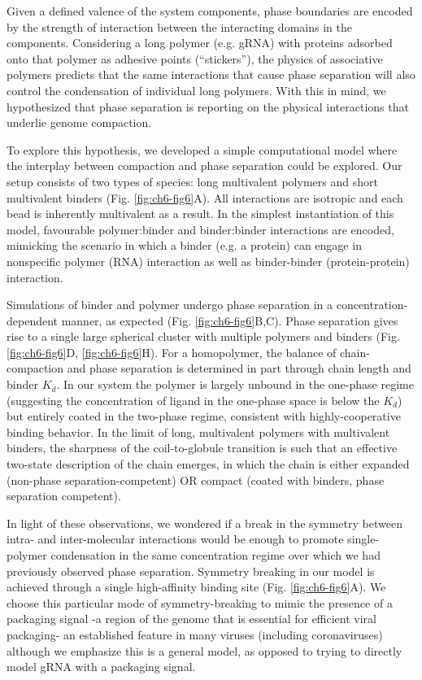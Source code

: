 \documentclass[../main.tex]{subfiles}
\begin{document}
        Given a defined valence of the system components, phase boundaries are encoded by the strength of interaction between the interacting domains in the components. Considering a long polymer (e.g. gRNA) with proteins adsorbed onto that polymer as adhesive points (“stickers”), the physics of associative polymers predicts that the same interactions that cause phase separation will also control the condensation of individual long polymers\cite{Martin2020-yc,Semenov1998-rp,Rubinstein2003-fa,Choi2020-nv,Choi2019-wg,Post1979-lv}. With this in mind, we hypothesized that phase separation is reporting on the physical interactions that underlie genome compaction.

        To explore this hypothesis, we developed a simple computational model where the interplay between compaction and phase separation could be explored. Our setup consists of two types of species: long multivalent polymers and short multivalent binders (Fig. \ref{fig:ch6-fig6}A). All interactions are isotropic and each bead is inherently multivalent as a result. In the simplest instantiation of this model, favourable polymer:binder and binder:binder interactions are encoded, mimicking the scenario in which a binder (e.g. a protein) can engage in nonspecific polymer (RNA) interaction as well as binder-binder (protein-protein) interaction.
         
        Simulations of binder and polymer undergo phase separation in a concentration-dependent manner, as expected (Fig. \ref{fig:ch6-fig6}B,C). Phase separation gives rise to a single large spherical cluster with multiple polymers and binders (Fig. \ref{fig:ch6-fig6}D, \ref{fig:ch6-fig6}H). For a homopolymer, the balance of chain-compaction and phase separation is determined in part through chain length and binder $K_d$. In our system the polymer is largely unbound in the one-phase regime (suggesting the concentration of ligand in the one-phase space is below the $K_d$) but entirely coated in the two-phase regime, consistent with highly-cooperative binding behavior. In the limit of long, multivalent polymers with multivalent binders, the sharpness of the coil-to-globule transition is such that an effective two-state description of the chain emerges, in which the chain is either expanded (non-phase separation-competent) OR compact (coated with binders, phase separation competent). 

        In light of these observations, we wondered if a break in the symmetry between intra- and inter-molecular interactions would be enough to promote single-polymer condensation in the same concentration regime over which we had previously observed phase separation. Symmetry breaking in our model is achieved through a single high-affinity binding site (Fig. \ref{fig:ch6-fig6}A). We choose this particular mode of symmetry-breaking to mimic the presence of a packaging signal -a region of the genome that is essential for efficient viral packaging- an established feature in many viruses (including coronaviruses) although we emphasize this is a general model, as opposed to trying to directly model gRNA with a packaging signal\cite{Hsieh2005-sp,Woo1997-lo,Cologna2000-ex}. 
\end{document}
